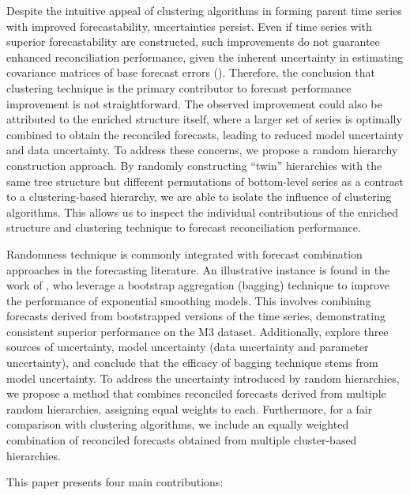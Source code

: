 \documentclass[a4paper,review,12pt,authoryear]{elsarticle}
\begin{document}
Despite the intuitive appeal of clustering algorithms in forming parent time series with improved forecastability, uncertainties persist. Even if time series with superior forecastability are constructed, such improvements do not guarantee enhanced reconciliation performance, given the inherent uncertainty in estimating covariance matrices of base forecast errors (\citealp{pritulargaStochasticCoherencyForecast2021}). Therefore, the conclusion that clustering technique is the primary contributor to forecast performance improvement is not straightforward. 
The observed improvement could also be attributed to the enriched structure itself, where a larger set of series is optimally combined to obtain the reconciled forecasts, leading to reduced model uncertainty and data uncertainty.
To address these concerns, we propose a random hierarchy construction approach. By randomly constructing ``twin'' hierarchies with the same tree structure but different permutations of bottom-level series as a contrast to a clustering-based hierarchy, we are able to isolate the influence of clustering algorithms. This allows us to inspect the individual contributions of the enriched structure and clustering technique to forecast reconciliation performance.

Randomness technique is commonly integrated with forecast combination approaches in the forecasting literature. An illustrative instance is found in the work of \cite{bergmeirBaggingExponentialSmoothing2016}, who leverage a bootstrap aggregation (bagging) technique to improve the performance of exponential smoothing models. This involves combining forecasts derived from bootstrapped versions of the time series, demonstrating consistent superior performance on the M3 dataset. Additionally, \cite{petropoulosExploringSourcesUncertainty2018a} explore three sources of uncertainty, model uncertainty (data uncertainty and parameter uncertainty), and conclude that the efficacy of bagging technique stems from model uncertainty. To address the uncertainty introduced by random hierarchies, we propose a method that combines reconciled forecasts derived from multiple random hierarchies, assigning equal weights to each. Furthermore, for a fair comparison with clustering algorithms, we include an equally weighted combination of reconciled forecasts obtained from multiple cluster-based hierarchies.

This paper presents four main contributions:
\end{document}

